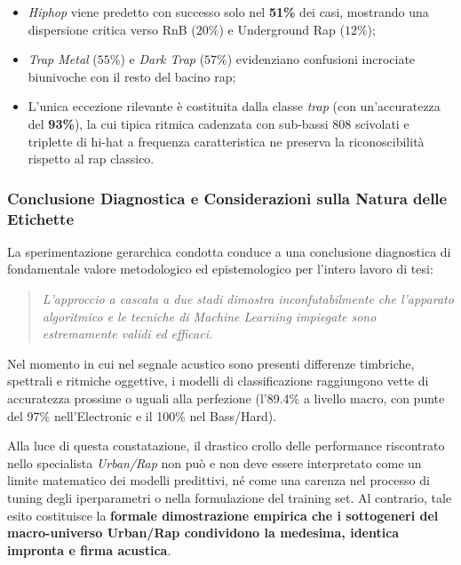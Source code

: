 \begin{itemize}
\begin{itemize}
        \item \textit{Hiphop} viene predetto con successo solo nel \textbf{51\%} dei casi, mostrando una dispersione critica verso RnB ($20\%$) e Underground Rap ($12\%$);
        \item \textit{Trap Metal} ($55\%$) e \textit{Dark Trap} ($57\%$) evidenziano confusioni incrociate biunivoche con il resto del bacino rap;
        \item L'unica eccezione rilevante è costituita dalla classe \textit{trap} (con un'accuratezza del \textbf{93\%}), la cui tipica ritmica cadenzata con sub-bassi 808 scivolati e triplette di hi-hat a frequenza caratteristica ne preserva la riconoscibilità rispetto al rap classico.
    \end{itemize}
\end{itemize}

\subsubsection{Conclusione Diagnostica e Considerazioni sulla Natura delle Etichette}

La sperimentazione gerarchica condotta conduce a una conclusione diagnostica di fondamentale valore metodologico ed epistemologico per l'intero lavoro di tesi:
\begin{quote}
\textit{L'approccio a cascata a due stadi dimostra inconfutabilmente che l'apparato algoritmico e le tecniche di Machine Learning impiegate sono estremamente validi ed efficaci.}
\end{quote}

Nel momento in cui nel segnale acustico sono presenti differenze timbriche, spettrali e ritmiche oggettive, i modelli di classificazione raggiungono vette di accuratezza prossime o uguali alla perfezione (l'89.4\% a livello macro, con punte del 97\% nell'Electronic e il 100\% nel Bass/Hard).

Alla luce di questa constatazione, il drastico crollo delle performance riscontrato nello specialista \textit{Urban/Rap} non può e non deve essere interpretato come un limite matematico dei modelli predittivi, né come una carenza nel processo di tuning degli iperparametri o nella formulazione del training set. Al contrario, tale esito costituisce la \textbf{formale dimostrazione empirica che i sottogeneri del macro-universo Urban/Rap condividono la medesima, identica impronta e firma acustica}.

